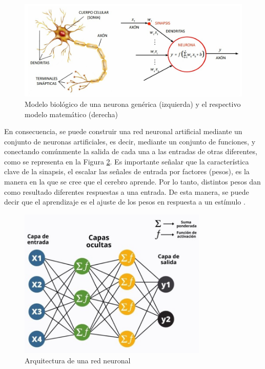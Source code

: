 \begin{figure} [H]
    \centering
    \begin{center}
      \includegraphics[width=15cm]{figs/Modelo neurona.jpeg}
    \end{center}
    \caption{Modelo biológico de una neurona genérica (izquierda) y el respectivo modelo matemático (derecha)}
    \label{fig:Modelo neurona}
\end{figure}

En consecuencia, se puede construir una red neuronal artificial mediante un conjunto de neuronas artificiales, es decir, mediante un conjunto de funciones, y conectando comúnmente la salida de cada una a las entradas de otras diferentes, como se representa en la Figura \ref{fig:Arquitectura red neuronal}. %
Es importante señalar que la característica clave de la sinapsis, el escalar las señales de entrada por factores (pesos), es la manera en la que se cree que el cerebro aprende. Por lo tanto, distintos pesos dan como resultado diferentes respuestas a una entrada. De esta manera, se puede decir que el aprendizaje es el ajuste de los pesos en respuesta a un estímulo \cite{Dinamarca18}.\\

\begin{figure} [H]
    \begin{center}
      \includegraphics[width=9cm]{figs/capas rrnn.jpeg}
    \end{center}
    \caption{Arquitectura de una red neuronal}
    \label{fig:Arquitectura red neuronal}
\end{figure}


